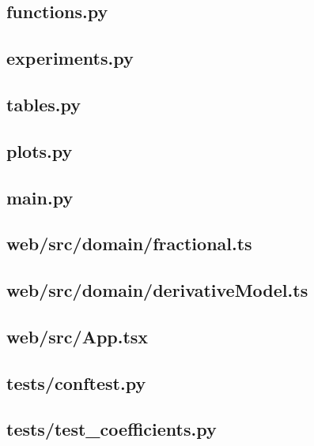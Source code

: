 \documentclass[14pt,a4paper]{extarticle}
\begin{document}
\subsection{functions.py}


\subsection{experiments.py}


\subsection{tables.py}


\subsection{plots.py}


\subsection{main.py}


\subsection{web/src/domain/fractional.ts}


\subsection{web/src/domain/derivativeModel.ts}


\subsection{web/src/App.tsx}


\subsection{tests/conftest.py}


\subsection{tests/test\_coefficients.py}

\end{document}
